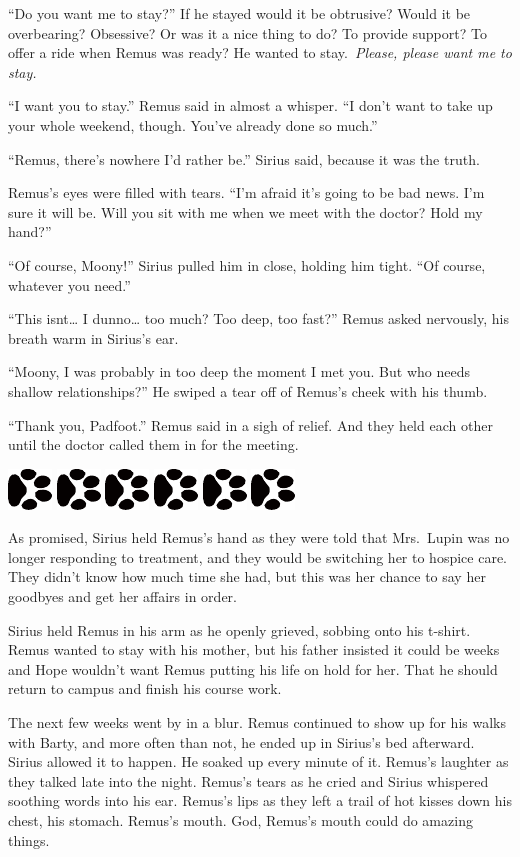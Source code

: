 \documentclass[12pt,twoside,openright]{memoir}
\newcommand{\dogPrintRule}{	
	\begin{center}
		\hspace{.5em}
		\includegraphics[angle=60]{dogprint.pdf}
		\hspace{.5em}
		\includegraphics[angle=120]{dogprint.pdf}
		\hspace{.5em}
		\includegraphics[angle=60]{dogprint.pdf}
		\hspace{.5em}
		\includegraphics[angle=120]{dogprint.pdf}
		\hspace{.5em}
		\includegraphics[angle=60]{dogprint.pdf}
		\hspace{.5em}
		\includegraphics[angle=120]{dogprint.pdf}
		\hspace{.5em}
	\end{center}
}
\begin{document}
``Do you want me to stay?'' If he stayed would it be obtrusive? Would it be overbearing? Obsessive? Or was it a nice thing to do? To provide support? To offer a ride when Remus was ready? He wanted to stay.\ \textit{Please, please want me to stay. }

``I want you to stay.'' Remus said in almost a whisper. ``I don't want to take up your whole weekend, though. You've already done so much.''

``Remus, there's nowhere I'd rather be.'' Sirius said, because it was the truth.

Remus's eyes were filled with tears. ``I'm afraid it's going to be bad news. I'm sure it will be. Will you sit with me when we meet with the doctor? Hold my hand?''

``Of course, Moony!'' Sirius pulled him in close, holding him tight. ``Of course, whatever you need.''

``This isnt… I dunno… too much? Too deep, too fast?'' Remus asked nervously, his breath warm in Sirius's ear.

``Moony, I was probably in too deep the moment I met you. But who needs shallow relationships?'' He swiped a tear off of Remus's cheek with his thumb.

``Thank you, Padfoot.'' Remus said in a sigh of relief. And they held each other until the doctor called them in for the meeting.

\dogPrintRule

As promised, Sirius held Remus's hand as they were told that Mrs.\ Lupin was no longer responding to treatment, and they would be switching her to hospice care. They didn't know how much time she had, but this was her chance to say her goodbyes and get her affairs in order.

Sirius held Remus in his arm as he openly grieved, sobbing onto his t-shirt. Remus wanted to stay with his mother, but his father insisted it could be weeks and Hope wouldn't want Remus putting his life on hold for her. That he should return to campus and finish his course work.

The next few weeks went by in a blur. Remus continued to show up for his walks with Barty, and more often than not, he ended up in Sirius's bed afterward. Sirius allowed it to happen. He soaked up every minute of it. Remus's laughter as they talked late into the night. Remus's tears as he cried and Sirius whispered soothing words into his ear. Remus's lips as they left a trail of hot kisses down his chest, his stomach. Remus's mouth. God, Remus's mouth could do amazing things. 
\end{document}
